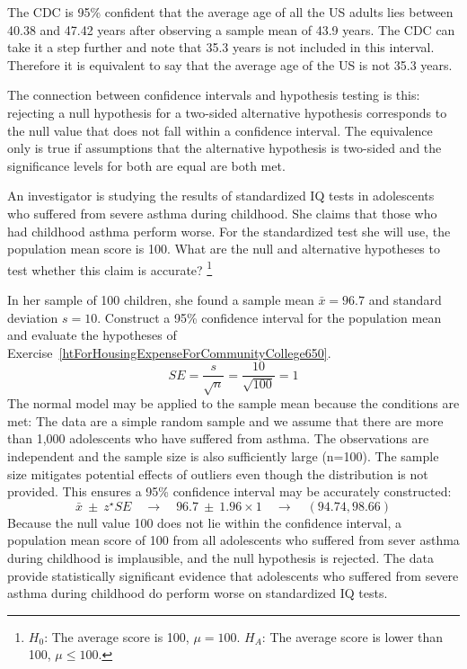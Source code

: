 The CDC is 95\% confident that the average age of all the US adults lies between 40.38 and 47.42 years after observing a sample mean of 43.9 years. The CDC can take it a step further and note that 35.3 years is not included in this interval. Therefore it is equivalent to say that the average age of the US is not 35.3 years. 

The connection between confidence intervals and hypothesis testing is this: rejecting a null hypothesis for a two-sided alternative hypothesis corresponds to the null value that does not fall within a confidence interval. The equivalence only is true if assumptions that the alternative hypothesis is two-sided and the significance levels for both are equal are both met. 

\begin{exercise} \label{htForHousingExpenseForCommunityCollege650} 
An investigator is studying the results of standardized IQ tests in adolescents who suffered from severe asthma during childhood. She claims that those who had childhood asthma perform worse. For the standardized test she will use, the population mean score is 100. What are the null and alternative hypotheses to test whether this claim is accurate? \footnote{$H_0$: The average score is 100, $\mu = 100$. \hspace{3.4mm} $H_A$: The average score is lower than 100, $\mu \leq 100$.}
\end{exercise}

\begin{example}{In her sample of 100 children, she found a sample mean $\bar{x} = 96.7$ and standard deviation $s = 10$. Construct a 95\% confidence interval for the population mean and evaluate the hypotheses of Exercise~\ref{htForHousingExpenseForCommunityCollege650}.}
$$ SE = \frac{s}{\sqrt{n}} = \frac{10}{\sqrt{100}} = 1 $$
The normal model may be applied to the sample mean because the conditions are met: The data are a simple random sample and we assume that there are more than 1,000 adolescents who have suffered from asthma. The observations are independent and the sample size is also sufficiently large (n=100). The sample size mitigates potential effects of outliers even though the distribution is not provided. This ensures a 95\% confidence interval may be accurately constructed:
$$\bar{x}\ \pm\ z^{\star} SE \quad\to\quad 96.7\ \pm\ 1.96 \times  1 \quad \to \quad (94.74, 98.66) $$
Because the null value 100 does not lie within the confidence interval, a population mean score of 100 from all adolescents who suffered from sever asthma during childhood is implausible, and the null hypothesis is rejected. The data provide statistically significant evidence that adolescents who suffered from severe asthma during childhood do perform worse on standardized IQ tests. 
\end{example}

